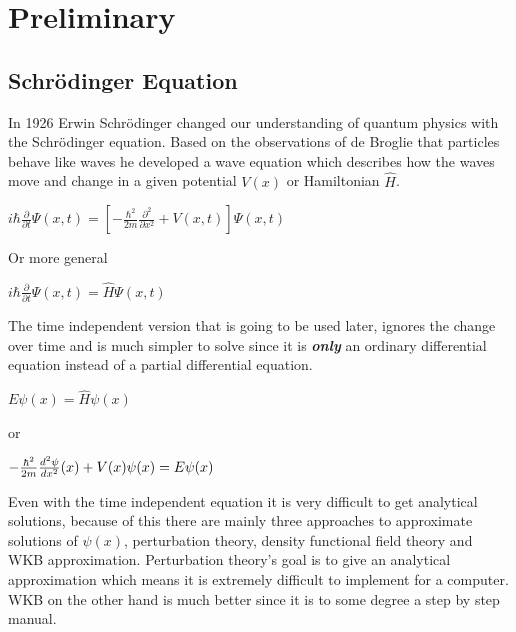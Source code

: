 \documentclass[11pt,DIV=10,final]{scrreprt} %
\begin{document}
\chapter{Preliminary}
\section{Schrödinger Equation}
In 1926 Erwin Schrödinger changed our understanding of quantum physics with the Schrödinger equation. Based on the observations of de Broglie that particles
behave like waves he developed a wave equation which describes how the waves move and change in a given potential $V(x)$ or Hamiltonian $\hat{H}$.
\begin{center}
\begin{math}
  i\hbar {\frac {\partial }{\partial t}}\Psi (x,t)=\left[-{\frac {\hbar ^{2}}{2m}}{\frac {\partial ^{2}}{\partial x^{2}}}+V(x,t)\right]\Psi (x,t)
\end{math}
\end{center}
Or more general
\begin{center}
\begin{math}
  i\hbar {\frac {\partial }{\partial t}}\Psi (x,t)=\hat{H} \Psi(x,t)
\end{math}
\end{center}

The time independent version that is going to be used later, ignores the change over time and is much simpler to solve since it is \emph{\textbf{only}} an ordinary differential equation instead of a partial differential equation.
\begin{center}
\begin{math}
  E \psi (x)=\hat{H} \psi(x)
\end{math}
\end{center}
or
\begin{center}
\begin{math}
  -{\hbar^{2} \over 2m}  {d^{2} \psi \over dx^{2}} (x) + V(x) \psi(x) = E \psi(x)
\end{math}
\end{center}

Even with the time independent equation it is very difficult to get analytical solutions, because of this there are mainly three approaches to
approximate solutions of $\psi(x)$, perturbation theory, density functional field theory and WKB approximation. Perturbation theory's goal is to give an analytical approximation which means it
is extremely difficult to implement for a computer. WKB on the other hand is much better since it is to some degree a step by step manual.
\end{document}
